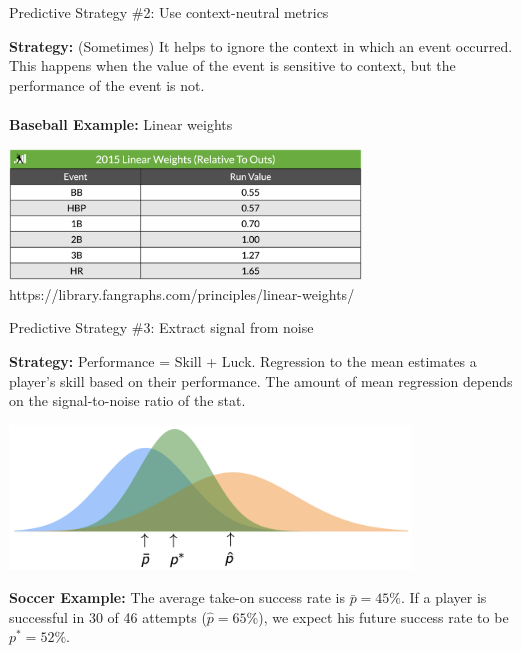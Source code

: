 \documentclass{beamer}
\begin{document}
\begin{frame}{Predictive Strategy \#2: Use context-neutral metrics}

  {\bf Strategy:} (Sometimes) It helps to ignore the context in which an event occurred. This happens when the value of the event is sensitive to context, but the performance of the event is not.\\
  ~\\
  {\bf Baseball Example:} Linear weights
  \begin{center}
    \includegraphics[width = 0.7\textwidth]{images/linear_weights.png}\\
    {\scriptsize \color{gray} https://library.fangraphs.com/principles/linear-weights/}
  \end{center}
\end{frame}


\begin{frame}{Predictive Strategy \#3: Extract signal from noise}

  {\bf Strategy:} Performance = Skill + Luck. Regression to the mean estimates a player's skill based on their performance. The amount of mean regression depends on the signal-to-noise ratio of the stat.
  \begin{center}
    \includegraphics[width = 0.8\textwidth]{images/rttm.png}
  \end{center}
  {\bf Soccer Example:} The average take-on success rate is $\bar p = 45\%$. If a player is successful in 30 of 46 attempts ($\hat p = 65\%$), we expect his future success rate to be $p^* = 52\%$.
\end{frame}
\end{document}

